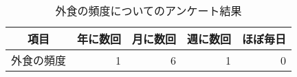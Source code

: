 \begin{table}[H]
\centering
\caption{外食の頻度についてのアンケート結果}
\label{table:questionnaire:frequency}
\small
\begin{tabular}{|c|r|r|r|r|}
\hline
項目 & 年に数回 & 月に数回 & 週に数回 & ほぼ毎日 \\ \hline
外食の頻度 & 1 & 6 & 1 & 0 \\ \hline
\end{tabular}
\end{table}
